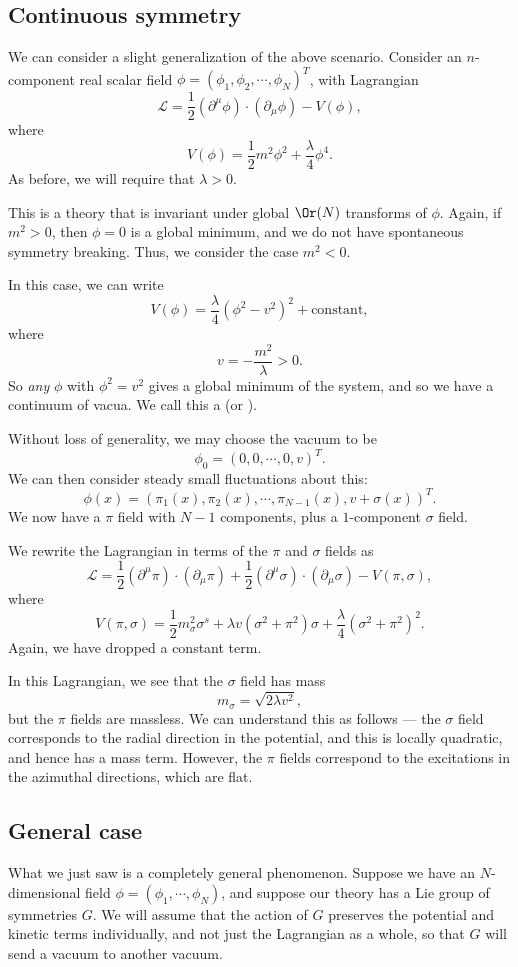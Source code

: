 \documentclass[a4paper]{article}
\begin{document}
\subsection{Continuous symmetry}
We can consider a slight generalization of the above scenario. Consider an $n$-component real scalar field $\phi = (\phi_1, \phi_2, \cdots, \phi_N)^T$, with Lagrangian
\[
  \mathcal{L} = \frac{1}{2} (\partial^\mu \phi) \cdot (\partial_\mu \phi) - V(\phi),
\]
where
\[
  V(\phi) = \frac{1}{2} m^2 \phi^2 + \frac{\lambda}{4} \phi^4.
\]
As before, we will require that $\lambda > 0$.

This is a theory that is invariant under global $\Or(N)$ transforms of $\phi$. Again, if $m^2 > 0$, then $\phi = 0$ is a global minimum, and we do not have spontaneous symmetry breaking. Thus, we consider the case $m^2 < 0$.

In this case, we can write
\[
  V(\phi) = \frac{\lambda}{4} (\phi^2 - v^2)^2 + \text{constant},
\]
where
\[
  v = -\frac{m^2}{\lambda} > 0.
\]
So \emph{any} $\phi$ with $\phi^2 = v^2$ gives a global minimum of the system, and so we have a continuum of vacua. We call this a  (or ).

Without loss of generality, we may choose the vacuum to be
\[
  \phi_0 = (0, 0, \cdots, 0, v)^T.
\]
We can then consider steady small fluctuations about this:
\[
  \phi(x) = (\pi_1(x), \pi_2(x), \cdots, \pi_{N-1}(x), v + \sigma(x))^T.
\]
We now have a $\pi$ field with $N - 1$ components, plus a $1$-component $\sigma$ field.

We rewrite the Lagrangian in terms of the $\pi$ and $\sigma$ fields as
\[
  \mathcal{L} = \frac{1}{2}(\partial^\mu \pi) \cdot (\partial_\mu \pi) + \frac{1}{2}(\partial^\mu \sigma) \cdot (\partial_\mu \sigma) - V(\pi, \sigma),
\]
where
\[
  V(\pi, \sigma) = \frac{1}{2} m_\sigma^2 \sigma^s + \lambda v(\sigma^2 + \pi^2) \sigma + \frac{\lambda}{4}(\sigma^2 + \pi^2)^2.
\]
Again, we have dropped a constant term.

In this Lagrangian, we see that the $\sigma$ field has mass
\[
  m_\sigma = \sqrt{2\lambda v^2},
\]
but the $\pi$ fields are massless. We can understand this as follows --- the $\sigma$ field corresponds to the radial direction in the potential, and this is locally quadratic, and hence has a mass term. However, the $\pi$ fields correspond to the excitations in the azimuthal directions, which are flat.

\subsection{General case}
What we just saw is a completely general phenomenon. Suppose we have an $N$-dimensional field $\phi = (\phi_1, \cdots, \phi_N)$, and suppose our theory has a Lie group of symmetries $G$. We will assume that the action of $G$ preserves the potential and kinetic terms individually, and not just the Lagrangian as a whole, so that $G$ will send a vacuum to another vacuum.
\end{document}
